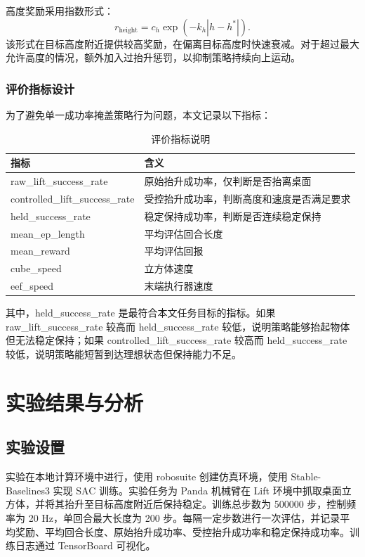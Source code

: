 \documentclass[
    type = bachelor,
    oneside,
    fontset = fandol
]{njuthesis}
\begin{document}
高度奖励采用指数形式：
\begin{equation}
  r_{\mathrm{height}} = c_h \exp(-k_h|h-h^*|).
\end{equation}
该形式在目标高度附近提供较高奖励，在偏离目标高度时快速衰减。对于超过最大允许高度的情况，额外加入过抬升惩罚，以抑制策略持续向上运动。

\subsection{评价指标设计}

为了避免单一成功率掩盖策略行为问题，本文记录以下指标：

\begin{table}[htbp]
  \centering
  \caption{评价指标说明}
  \label{tab:metrics}
  \begin{tabular}{ll}
    \toprule
    指标 & 含义 \\
    \midrule
    raw\_lift\_success\_rate & 原始抬升成功率，仅判断是否抬离桌面 \\
    controlled\_lift\_success\_rate & 受控抬升成功率，判断高度和速度是否满足要求 \\
    held\_success\_rate & 稳定保持成功率，判断是否连续稳定保持 \\
    mean\_ep\_length & 平均评估回合长度 \\
    mean\_reward & 平均评估回报 \\
    cube\_speed & 立方体速度 \\
    eef\_speed & 末端执行器速度 \\
    \bottomrule
  \end{tabular}
\end{table}

其中，held\_success\_rate 是最符合本文任务目标的指标。如果 raw\_lift\_success\_rate 较高而 held\_success\_rate 较低，说明策略能够抬起物体但无法稳定保持；如果 controlled\_lift\_success\_rate 较高而 held\_success\_rate 较低，说明策略能短暂到达理想状态但保持能力不足。

\chapter{实验结果与分析}

\section{实验设置}

实验在本地计算环境中进行，使用 robosuite 创建仿真环境，使用 Stable-Baselines3 实现 SAC 训练。实验任务为 Panda 机械臂在 Lift 环境中抓取桌面立方体，并将其抬升至目标高度附近后保持稳定。训练总步数为 500000 步，控制频率为 20 Hz，单回合最大长度为 200 步。每隔一定步数进行一次评估，并记录平均奖励、平均回合长度、原始抬升成功率、受控抬升成功率和稳定保持成功率。训练日志通过 TensorBoard 可视化。
\end{document}

